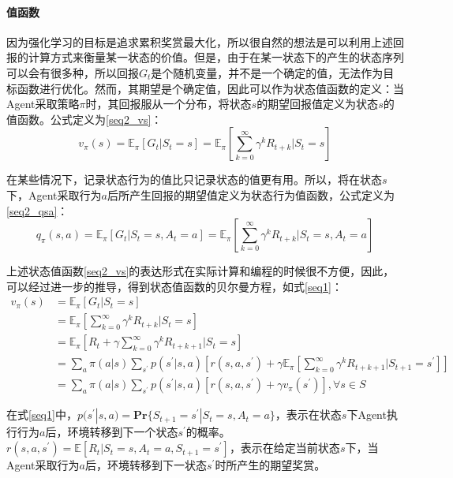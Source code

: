 \paragraph{值函数}

因为强化学习的目标是追求累积奖赏最大化，所以很自然的想法是可以利用上述回报的计算方式来衡量某一状态的价值。但是，由于在某一状态下的产生的状态序列可以会有很多种，所以回报$G_{t}$是个随机变量，并不是一个确定的值，无法作为目标函数进行优化。然而，其期望是个确定值，因此可以作为状态值函数的定义：当Agent采取策略$\pi$时，其回报服从一个分布，将状态$s$的期望回报值定义为状态$s$的值函数。公式定义为\eqref{seq2_vs}：
\begin{equation}
\label{seq2_vs}
v_{\pi}(s)=\mathbb{E}_{\pi}[G_{t}|S_t=s]=\mathbb{E}_{\pi}[\sum_{k=0}^{\infty}\gamma^{k}R_{t+k}|S_t=s]
\end{equation}


在某些情况下，记录状态行为的值比只记录状态的值更有用。所以，将在状态$s$下，Agent采取行为$a$后所产生回报的期望值定义为状态行为值函数，公式定义为\eqref{seq2_qsa}：
\begin{equation}
\label{seq2_qsa}
q_{\pi}(s,a)=\mathbb{E}_{\pi}[G_{t}|S_t=s,A_t=a]
=\mathbb{E}_{\pi}[\sum_{k=0}^{\infty}\gamma^{k}R_{t+k}|S_t=s,A_t=a]
\end{equation}

上述状态值函数\eqref{seq2_vs}的表达形式在实际计算和编程的时候很不方便，因此，可以经过进一步的推导，得到状态值函数的贝尔曼方程，如式\eqref{seq1}：
\begin{equation}
\label{seq1}
\begin{aligned}
v_{\pi}(s)&=\mathbb{E}_{\pi}[G_{t}|S_t=s]\\
&=\mathbb{E}_{\pi}[\sum_{k=0}^{\infty}\gamma^{k}R_{t+k} | S_t=s]\\
&=\mathbb{E}_{\pi}[R_{t} + \gamma \sum_{k=0}^{\infty}\gamma^{k}R_{t+k+1}|S_t=s]\\
&=\sum_{a}\pi(a|s)\sum_{s^{'}}p(s^{'}|s,a)[r(s,a,s^{'}) + \gamma \mathbb{E}_{\pi}[\sum_{k=0}^{\infty}\gamma^{k} R_{t+k+1} |S_{t+1}=s^{'}]]\\
&=\sum_{a}\pi(a|s)\sum_{s^{'}}p(s^{'}|s,a)[r(s,a,s^{'})+\gamma v_{\pi}(s^{'})], \forall s \in S
\end{aligned}
\end{equation}

在式\eqref{seq1}中，$p(s^{'}|s,a) = \bm{\text{Pr}}\{S_{t+1}=s^{'}|S_{t}=s, A_{t}=a\}$，表示在状态$s$下Agent执行行为$a$后，环境转移到下一个状态$s^{'}$的概率。$r(s,a,s^{'})=\mathbb{E}[R_{t}|S_{t}=s,A_{t}=a,S_{t+1}=s^{'}]
$，表示在给定当前状态$s$下，当Agent采取行为$a$后，环境转移到下一状态$s^{'}$时所产生的期望奖赏。

